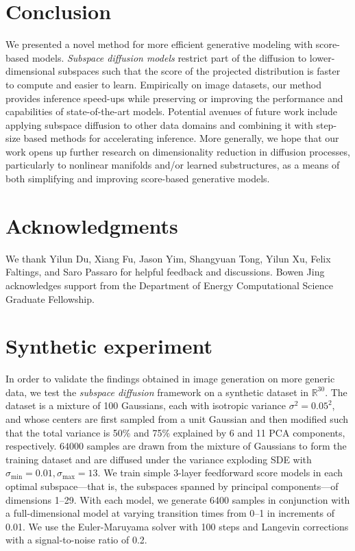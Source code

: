 \documentclass{article}
\begin{document}
\section{Conclusion}
We presented a novel method for more efficient generative modeling with score-based models. \textit{Subspace diffusion models} restrict part of the diffusion to lower-dimensional subspaces such that the score of the projected distribution is faster to compute and easier to learn. Empirically on image datasets, our method provides inference speed-ups while preserving or improving the performance and capabilities of  state-of-the-art models. Potential avenues of future work include applying subspace diffusion to other data domains and combining it with step-size based methods for accelerating inference. More generally, we hope that our work opens up further research on dimensionality reduction in diffusion processes, particularly to nonlinear manifolds and/or learned substructures, as a means of both simplifying and improving score-based generative models.

\section*{Acknowledgments}
We thank Yilun Du, Xiang Fu, Jason Yim, Shangyuan Tong, Yilun Xu, Felix Faltings, and Saro Passaro for helpful feedback and discussions. Bowen Jing acknowledges support from the Department of Energy Computational Science Graduate Fellowship.



\clearpage
\appendix
\section{Synthetic experiment}\label{app:synthetic}

In order to validate the findings obtained in image generation on more generic data, we test the \textit{subspace diffusion} framework on a synthetic dataset in $\mathbb{R}^{30}$. The dataset is a mixture of 100 Gaussians, each with isotropic variance $\sigma^2 = 0.05^2$, and whose centers are first sampled from a unit Gaussian and then modified such that the total variance is 50\% and 75\% explained by 6 and 11 PCA components, respectively. $64000$ samples are drawn from the mixture of Gaussians to form the training dataset and are diffused under the variance exploding SDE with $\sigma_\text{min}=0.01, \sigma_\text{max}=13$. We train simple 3-layer feedforward score models in each optimal subspace---that is, the subspaces spanned by principal components---of dimensions 1--29. With each model, we generate 6400 samples in conjunction with a full-dimensional model at varying transition times from 0--1 in increments of 0.01. We use the Euler-Maruyama solver with 100 steps and Langevin corrections with a signal-to-noise ratio of 0.2.
\end{document}
